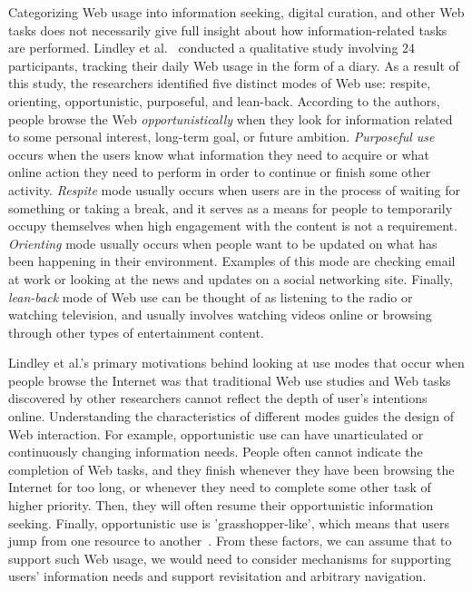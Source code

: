 {{{Categorizing Web usage into information seeking, digital curation, and other Web tasks does not necessarily give full insight about how information-related tasks are performed. Lindley et al.~\cite{lindley2012s} conducted a qualitative study involving 24 participants, tracking their daily Web usage in the form of a diary. As a result of this study, the researchers identified five distinct modes of Web use: respite, orienting, opportunistic, purposeful, and lean-back. According to the authors, people browse the Web \textit{opportunistically} when they look for information related to some personal interest, long-term goal, or future ambition. \textit{Purposeful use} occurs when the users know what information they need to acquire or what online action they need to perform in order to continue or finish some other activity. \textit{Respite} mode usually occurs when users are in the process of waiting for something or taking a break, and it serves as a means for people to temporarily occupy themselves when high engagement with the content is not a requirement. \textit{Orienting} mode usually occurs when people want to be updated on what has been happening in their environment. Examples of this mode are checking email at work or looking at the news and updates on a social networking site. Finally, \textit{lean-back} mode of Web use can be thought of as listening to the radio or watching television, and usually involves watching videos online or browsing through other types of entertainment content. 

Lindley et al.'s primary motivations behind looking at use modes that occur when people browse the Internet was that traditional Web use studies and Web tasks discovered by other researchers cannot reflect the depth of user's intentions online. Understanding the characteristics of different modes guides the design of Web interaction. For example, opportunistic use can have unarticulated or continuously changing information needs. People often cannot indicate the completion of Web tasks, and they finish whenever they have been browsing the Internet for too long, or whenever they need to complete some other task of higher priority. Then, they will often resume their opportunistic information seeking. Finally, opportunistic use is 'grasshopper-like', which means that users jump from one resource to another~\cite{lindley2012s}. From these factors, we can assume that to support such Web usage, we would need to consider mechanisms for supporting users' information needs and support revisitation and arbitrary navigation.

}}}
